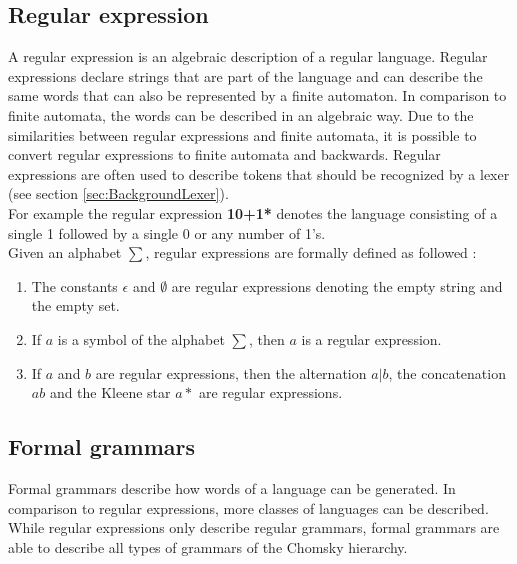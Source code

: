 \subsection{Regular expression}\label{sec:BackgroundRegEx}

A regular expression is an algebraic description of a regular language.
Regular expressions declare strings that are part of the language and can describe the same words that can also be represented by a finite automaton. 
In comparison to finite automata, the words can be described in an algebraic way. 
Due to the similarities between regular expressions and finite automata, it is possible to convert regular expressions to finite automata and backwards. 
Regular expressions are often used to describe tokens that should be recognized by a lexer (see section \ref{sec:BackgroundLexer}). \cite{AutomataTheory.2007}\\
For example the regular expression \textbf{10+1*} denotes the language consisting of a single 1 followed by a single 0 or any number of 1's.\\
Given an alphabet $\sum$, regular expressions are formally defined as followed \cite{AutomataTheory.2007}:
\begin{enumerate}
\item The constants $\epsilon$ and $\emptyset$ are regular expressions denoting the empty string and the empty set.
\item If $a$ is a symbol of the alphabet $\sum$, then $a$ is a regular expression.
\item If $a$ and $b$ are regular expressions, then the alternation $a|b$, the concatenation $ab$ and the Kleene star $a*$ are regular expressions.
\end{enumerate}


\subsection{Formal grammars}\label{sec:BackgroundGrammar}

Formal grammars describe how words of a language can be generated. In comparison to regular expressions, more classes of languages can be described. While regular expressions only describe regular grammars, formal grammars are able to describe all types of grammars of the Chomsky hierarchy.


